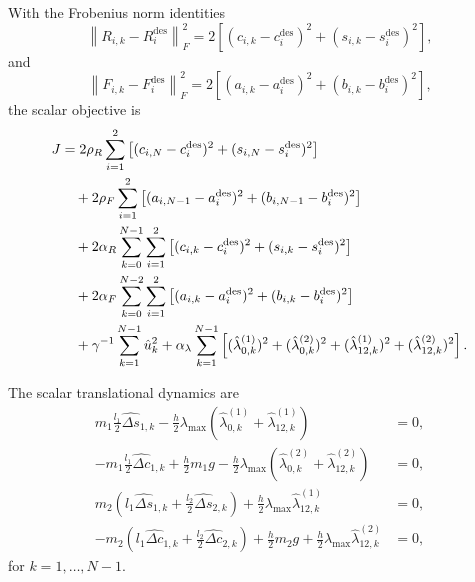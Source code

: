 With the Frobenius norm identities
\[
\left\|
R_{i,k}-R_i^{\mathrm{des}}
\right\|_F^2
=
2
\left[
(c_{i,k}-c_i^{\mathrm{des}})^2
+
(s_{i,k}-s_i^{\mathrm{des}})^2
\right],
\]
and
\[
\left\|
F_{i,k}-F_i^{\mathrm{des}}
\right\|_F^2
=
2
\left[
(a_{i,k}-a_i^{\mathrm{des}})^2
+
(b_{i,k}-b_i^{\mathrm{des}})^2
\right],
\]
the scalar objective is
\begin{align}
J
&=
2\rho_R
\sum_{i=1}^{2}
\left[
(c_{i,N}-c_i^{\mathrm{des}})^2
+
(s_{i,N}-s_i^{\mathrm{des}})^2
\right]
\notag\\
&\quad
+
2\rho_F
\sum_{i=1}^{2}
\left[
(a_{i,N-1}-a_i^{\mathrm{des}})^2
+
(b_{i,N-1}-b_i^{\mathrm{des}})^2
\right]
\notag\\
&\quad
+
2\alpha_R
\sum_{k=0}^{N-1}
\sum_{i=1}^{2}
\left[
(c_{i,k}-c_i^{\mathrm{des}})^2
+
(s_{i,k}-s_i^{\mathrm{des}})^2
\right]
\notag\\
&\quad
+
2\alpha_F
\sum_{k=0}^{N-2}
\sum_{i=1}^{2}
\left[
(a_{i,k}-a_i^{\mathrm{des}})^2
+
(b_{i,k}-b_i^{\mathrm{des}})^2
\right]
\notag\\
&\quad
+
\gamma^{-1}
\sum_{k=1}^{N-1}
\hat u_k^2
+
\alpha_\lambda
\sum_{k=1}^{N-1}
\left[
(\hat\lambda_{0,k}^{(1)})^2
+
(\hat\lambda_{0,k}^{(2)})^2
+
(\hat\lambda_{12,k}^{(1)})^2
+
(\hat\lambda_{12,k}^{(2)})^2
\right].
\label{eq:forced_acrobot_reduced_model2_obj_scalar}
\end{align}

The scalar translational dynamics are
\begin{align}
m_1\frac{l_1}{2}\widehat{\Delta s}_{1,k}
-
\frac{h}{2}
\lambda_{\max}
\left(
\hat\lambda_{0,k}^{(1)}
+
\hat\lambda_{12,k}^{(1)}
\right)
&=0,
\label{eq:forced_acrobot_reduced_model2_scalar_trans1x}
\\
-
m_1\frac{l_1}{2}\widehat{\Delta c}_{1,k}
+
\frac{h}{2}m_1g
-
\frac{h}{2}
\lambda_{\max}
\left(
\hat\lambda_{0,k}^{(2)}
+
\hat\lambda_{12,k}^{(2)}
\right)
&=0,
\label{eq:forced_acrobot_reduced_model2_scalar_trans1y}
\\
m_2
\left(
l_1\widehat{\Delta s}_{1,k}
+
\frac{l_2}{2}\widehat{\Delta s}_{2,k}
\right)
+
\frac{h}{2}
\lambda_{\max}
\hat\lambda_{12,k}^{(1)}
&=0,
\label{eq:forced_acrobot_reduced_model2_scalar_trans2x}
\\
-
m_2
\left(
l_1\widehat{\Delta c}_{1,k}
+
\frac{l_2}{2}\widehat{\Delta c}_{2,k}
\right)
+
\frac{h}{2}m_2g
+
\frac{h}{2}
\lambda_{\max}
\hat\lambda_{12,k}^{(2)}
&=0,
\label{eq:forced_acrobot_reduced_model2_scalar_trans2y}
\end{align}
for \(k=1,\ldots,N-1\).

